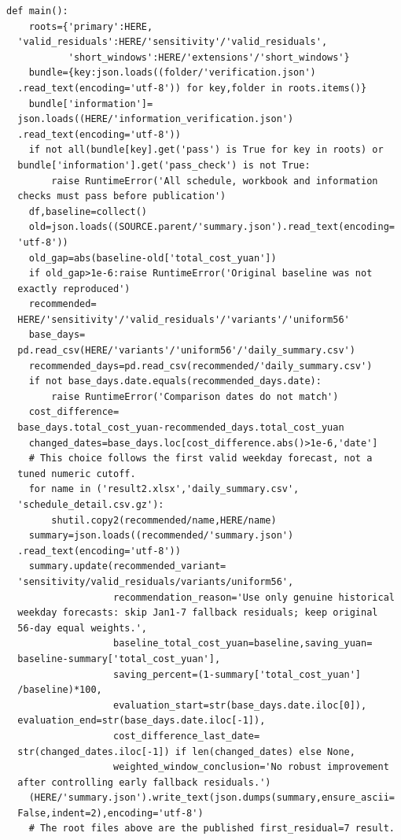 \begin{verbatim}
def main():
    roots={'primary':HERE,
  'valid_residuals':HERE/'sensitivity'/'valid_residuals',
           'short_windows':HERE/'extensions'/'short_windows'}
    bundle={key:json.loads((folder/'verification.json')
  .read_text(encoding='utf-8')) for key,folder in roots.items()}
    bundle['information']=
  json.loads((HERE/'information_verification.json')
  .read_text(encoding='utf-8'))
    if not all(bundle[key].get('pass') is True for key in roots) or
  bundle['information'].get('pass_check') is not True:
        raise RuntimeError('All schedule, workbook and information
  checks must pass before publication')
    df,baseline=collect()
    old=json.loads((SOURCE.parent/'summary.json').read_text(encoding=
  'utf-8'))
    old_gap=abs(baseline-old['total_cost_yuan'])
    if old_gap>1e-6:raise RuntimeError('Original baseline was not
  exactly reproduced')
    recommended=
  HERE/'sensitivity'/'valid_residuals'/'variants'/'uniform56'
    base_days=
  pd.read_csv(HERE/'variants'/'uniform56'/'daily_summary.csv')
    recommended_days=pd.read_csv(recommended/'daily_summary.csv')
    if not base_days.date.equals(recommended_days.date):
        raise RuntimeError('Comparison dates do not match')
    cost_difference=
  base_days.total_cost_yuan-recommended_days.total_cost_yuan
    changed_dates=base_days.loc[cost_difference.abs()>1e-6,'date']
    # This choice follows the first valid weekday forecast, not a
  tuned numeric cutoff.
    for name in ('result2.xlsx','daily_summary.csv',
  'schedule_detail.csv.gz'):
        shutil.copy2(recommended/name,HERE/name)
    summary=json.loads((recommended/'summary.json')
  .read_text(encoding='utf-8'))
    summary.update(recommended_variant=
  'sensitivity/valid_residuals/variants/uniform56',
                   recommendation_reason='Use only genuine historical
  weekday forecasts: skip Jan1-7 fallback residuals; keep original
  56-day equal weights.',
                   baseline_total_cost_yuan=baseline,saving_yuan=
  baseline-summary['total_cost_yuan'],
                   saving_percent=(1-summary['total_cost_yuan']
  /baseline)*100,
                   evaluation_start=str(base_days.date.iloc[0]),
  evaluation_end=str(base_days.date.iloc[-1]),
                   cost_difference_last_date=
  str(changed_dates.iloc[-1]) if len(changed_dates) else None,
                   weighted_window_conclusion='No robust improvement
  after controlling early fallback residuals.')
    (HERE/'summary.json').write_text(json.dumps(summary,ensure_ascii=
  False,indent=2),encoding='utf-8')
    # The root files above are the published first_residual=7 result.

\end{verbatim}
